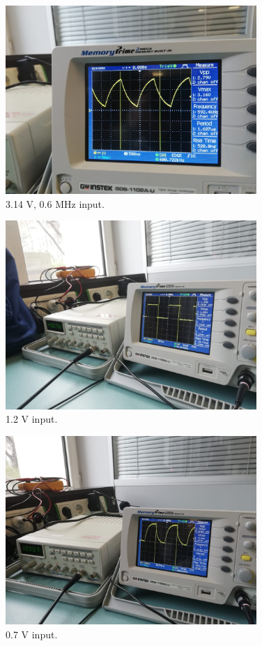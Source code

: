 \documentclass[pdftex,12pt,a4paper]{article}
\begin{document}
\begin{figure}[H]
	\centering
	\includegraphics[width=0.85\textwidth]{osc3.jpg}	
	\caption{3.14 V, 0.6 MHz input.}
	\label{fig11}
\end{figure}

\begin{figure}[H]
	\centering
	\includegraphics[width=0.85\textwidth]{osc4.jpg}	
	\caption{1.2 V input.}
	\label{fig12}
\end{figure}

\begin{figure}[H]
	\centering
	\includegraphics[width=0.85\textwidth]{osc5.jpg}	
	\caption{0.7 V input.}
	\label{fig13}
\end{figure}
\end{document}
